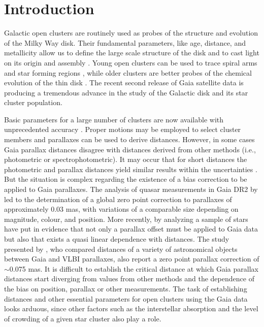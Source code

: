 \documentclass[draft]{aa}
\begin{document}
\section{Introduction}

Galactic open clusters are routinely used as probes of the structure and
evolution of the Milky Way disk. Their fundamental parameters, like age,
distance, and metallicity allow us to define the large scale structure of the
disk and to cast light on its origin and assembly \citep{Janes_1982,
Moitinho_2010,2018A&A...618A..93C}. Young open clusters can be used to trace
spiral arms and star forming regions \citep{Moitinho_2006,Vazquez2008}, while
older clusters are better probes of the chemical evolution of the thin disk
\citep{2009yCat..35120063M}. The recent second release of Gaia satellite data
\citep{GaiaDR2_2018} is producing a tremendous advance in the study of the
Galactic disk and its star cluster population.

Basic parameters for a large number of clusters are now available with
unprecedented accuracy \citep{2018A&A...618A..93C,Soubiran_2018,Bossini_2019,
Monteiro_2019}. Proper motions may be employed to select cluster members and
parallaxes can be used to derive distances. However, in some cases Gaia
parallax distances disagree with distances derived from other methods 
(i.e., photometric or spectrophotometric). It may occur that for
short distances the photometric and parallax distances yield similar results
within the uncertainties \citep{2018A&A...618A..93C}. But the situation is
complex regarding the existence of a bias correction to be applied to
Gaia parallaxes. The analysis of quasar measurements in Gaia DR2 by
\cite{Lindegren_2018} led to the determination of a global zero point
correction to parallaxes of approximately 0.03 mas, with variations of a
comparable size depending on magnitude, colour, and position.
More recently, by analyzing a sample of stars \cite{Schonrich2019} have put in
evidence that not only a parallax offset must be applied to Gaia data but also
that exists a quasi linear dependence with distances. The study presented by 
\cite{Xu_2019}, who compared distances of a variety of astronomical objects
between Gaia and VLBI parallaxes, also report a zero point parallax correction
of $\sim$0.075 mas.
It is difficult to establish the critical distance at which Gaia parallax
distances start diverging from values from other methods and the dependence of
the bias on position, parallax or other measurements. The  task of
establishing distances and other essential parameters for open clusters using
the Gaia data looks arduous, since other factors such as the interstellar
absorption and the level of crowding of a given star cluster also play a
role.
\end{document}
